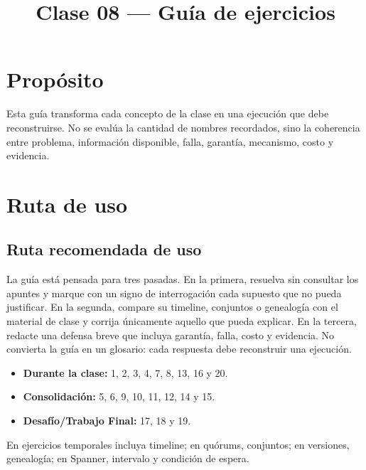 \documentclass[variant=guia,cover=institutional,mode=screen]{ua-engineering-v6-article}
\title{Clase 08 --- Guía de ejercicios}
\author{\UAProfessor}
\date{\UADate}
\begin{document}
\maketitle
\section{Propósito}
Esta guía transforma cada concepto de la clase en una ejecución que debe reconstruirse. No se evalúa la cantidad de nombres recordados, sino la coherencia entre problema, información disponible, falla, garantía, mecanismo, costo y evidencia.
\section{Ruta de uso}
\subsection{Ruta recomendada de uso}
La guía está pensada para tres pasadas. En la primera, resuelva sin consultar los apuntes y marque con un signo de interrogación cada supuesto que no pueda justificar. En la segunda, compare su timeline, conjuntos o genealogía con el material de clase y corrija únicamente aquello que pueda explicar. En la tercera, redacte una defensa breve que incluya garantía, falla, costo y evidencia. No convierta la guía en un glosario: cada respuesta debe reconstruir una ejecución.

\begin{itemize}
\item \textbf{Durante la clase:} 1, 2, 3, 4, 7, 8, 13, 16 y 20.
\item \textbf{Consolidación:} 5, 6, 9, 10, 11, 12, 14 y 15.
\item \textbf{Desafío/Trabajo Final:} 17, 18 y 19.
\end{itemize}
En ejercicios temporales incluya timeline; en quórums, conjuntos; en versiones, genealogía; en Spanner, intervalo y condición de espera.
\end{document}
